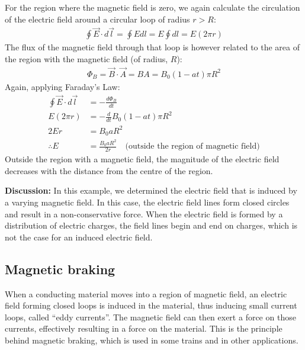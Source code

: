 \begin{example}
For the region where the magnetic field is zero, we again calculate the circulation of the electric field around a circular loop of radius $r>R$:
\begin{align*}
\oint \vec E \cdot d\vec l = \oint Edl = E \oint dl = E(2\pi r)
\end{align*}
The flux of the magnetic field through that loop is however related to the area of the region with the magnetic field (of radius, $R$):
\begin{align*}
\Phi_B = \vec B \cdot \vec A = BA = B_0(1-at) \pi R^2
\end{align*}
Again, applying Faraday's Law:
\begin{align*}
\oint \vec E\cdot d\vec l &= -\frac{d\Phi_B}{dt}\\
E(2\pi r) &= -\frac{d}{dt} B_0(1-at) \pi R^2\\
2Er&=  B_0aR^2\\
\therefore E&=\frac{B_0aR^2}{2r}\quad\text{(outside the region of magnetic field)}
\end{align*}
Outside the region with a magnetic field, the magnitude of the electric field decreases with the distance from the centre of the region.

\textbf{Discussion:} In this example, we determined the electric field that is induced by a varying magnetic field. In this case, the electric field lines form closed circles and result in a non-conservative force. When the electric field is formed by a distribution of electric charges, the field lines begin and end on charges, which is not the case for an induced electric field.
\end{example}
\newpage
\subsection{Magnetic braking}
When a conducting material moves into a region of magnetic field, an electric field forming closed loops is induced in the material, thus inducing small current loops, called ``eddy currents''. The magnetic field can then exert a force on those currents, effectively resulting in a force on the material. This is the principle behind magnetic braking, which is used in some trains and in other applications.

